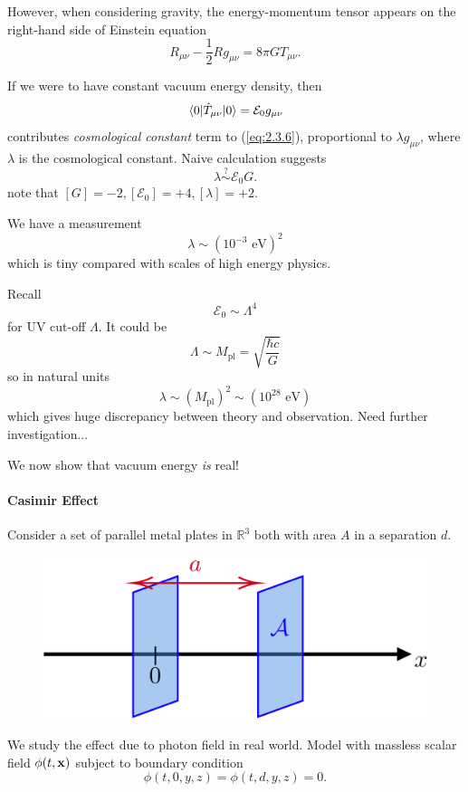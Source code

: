 \documentclass[a4paper,11pt]{article}
\begin{document}
	However, when considering gravity, the energy-momentum tensor appears on the right-hand side of Einstein equation
	\begin{equation}
		R _{\mu \nu} - \frac{1}{2} R g _{\mu \nu} = 8 \pi G T _{\mu \nu}.
		\label{eq:2.3.6}
	\end{equation}

	
	If we were to have constant vacuum energy density, then
	\[
		\mel{0}{\hat T _{\mu \nu}}{0} = \mathcal{E}_0 g _{\mu \nu}
	\]
	contributes \emph{cosmological constant} term to (\ref{eq:2.3.6}), proportional to $\lambda g _{\mu \nu}$, where $\lambda$ is the cosmological constant. Naive calculation suggests
	\[
		\lambda \overset{?}{\sim} \mathcal{E}_0 G.
	\]
	note that $[G] = -2, [\mathcal{E}_0] = + 4, [\lambda] = +2$. 

	We have a measurement
	\[
		\lambda \sim (10 ^{-3}\text{ eV})^2
	\]
	which is tiny compared with scales of high energy physics.

	Recall
	\[
		\mathcal{E}_0 \sim \Lambda^4
	\]
	for UV cut-off $\Lambda$. It could be
	\[
		\Lambda \sim M _{\text{pl}} = \sqrt{\frac{\hbar c}{G}}
	\]
	so in natural units
	\[
		\lambda \sim (M _{\text{pl}})^2 \sim (10 ^{28} \text{ eV})
	\]
	which gives huge discrepancy between theory and observation. Need further investigation... 

	We now show that vacuum energy \emph{is} real!

	\paragraph{Casimir Effect} Consider a set of parallel metal plates in $\mathbb{R}^3$ both with area $A$ in a separation $d$.

	\begin{figure}[H]
		\centering
		\includegraphics[width=0.5\linewidth]{fig/Casimir.pdf}
	\end{figure}
		
	We study the effect due to photon field in real world. Model with massless scalar field $\phi(t,\vb x)$ subject to boundary condition
	\[
		\phi(t,0,y,z) = \phi(t,d,y,z) = 0.
	\]
	
\end{document}
